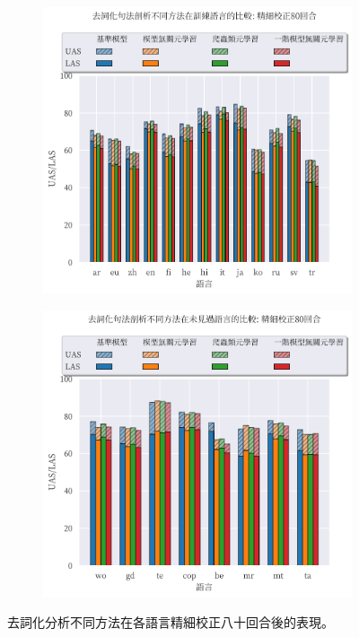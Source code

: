 \begin{figure}[htbp]
    \centering
    \begin{subfigure}[t]{0.8\textwidth}
        \centering
        \includegraphics[width=\textwidth]{figs/chapter3/delex/bar_full_epoch_80_train_langs.pdf}
    \end{subfigure}
    \vspace{-12pt}
    \begin{subfigure}[t]{0.8\textwidth}
        \centering
        \includegraphics[width=\textwidth]{figs/chapter3/delex/bar_full_epoch_80_test_langs.pdf}
    \end{subfigure}
    \caption{去詞化分析不同方法在各語言精細校正八十回合後的表現。}
    \label{fig:bar_full_epoch_80}
\end{figure}
